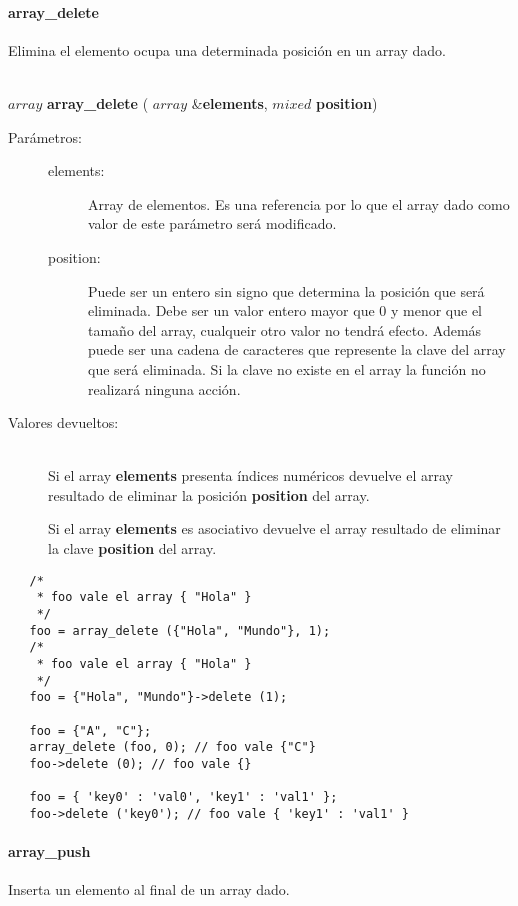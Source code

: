 \paragraph{array\_delete}
Elimina el elemento ocupa una determinada posición en un array dado.

\begin{framed}
\hfill \\ $array$ \textbf{array\_delete} ( $array$ \&\textbf{elements}, $mixed$ \textbf{position})  
\begin{description}
\item [Parámetros:] \hfill 
   \begin{description}
   \item[elements:] Array de elementos. Es una referencia por lo que el array dado como valor de este parámetro será modificado. 
   \item[position:] Puede ser un entero sin signo que determina la posición que será eliminada. Debe ser un valor entero mayor que $0$ y
   menor que el tamaño del array, cualqueir otro valor no tendrá efecto. Además puede ser una cadena de caracteres que 
   represente la clave del array que será eliminada. Si la clave no existe en el array la función no realizará ninguna acción.
   \end{description}
\item[Valores devueltos:] \hfill \\
   Si el array \textbf{elements} presenta índices numéricos devuelve el array resultado de eliminar la posición \textbf{position} del array. 
   
   Si el array \textbf{elements} es asociativo devuelve el array resultado de eliminar la clave \textbf{position} del array. 
\end{description}
\end{framed}
     
\begin{lstlisting}   
   /*
    * foo vale el array { "Hola" }
    */
   foo = array_delete ({"Hola", "Mundo"}, 1); 
   /*
    * foo vale el array { "Hola" }
    */
   foo = {"Hola", "Mundo"}->delete (1);
   
   foo = {"A", "C"};
   array_delete (foo, 0); // foo vale {"C"}
   foo->delete (0); // foo vale {}
   
   foo = { 'key0' : 'val0', 'key1' : 'val1' };
   foo->delete ('key0'); // foo vale { 'key1' : 'val1' }
\end{lstlisting}

\paragraph{array\_push}
Inserta un elemento al final de un array dado.

